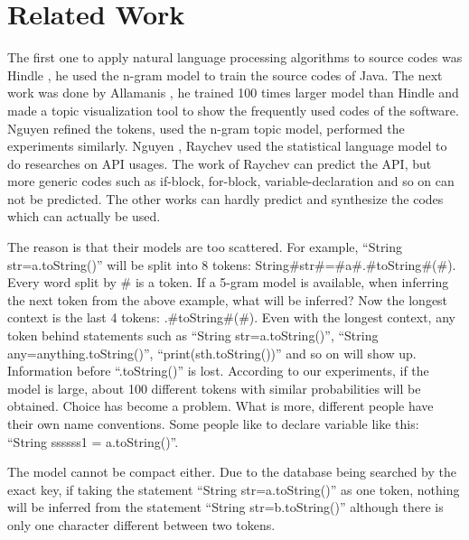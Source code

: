 \documentclass{sig-alternate-05-2015}
\begin{document}

\vspace{-0.2cm}
\section{Related Work}

The first one to apply natural language processing algorithms to source codes was Hindle \cite{DBLP:conf/icse/HindleBSGD12}, he used the n-gram \cite{cavnar1994n} model to train the source codes of Java. The next work was done by Allamanis \cite{DBLP:conf/msr/AllamanisS13a}, he trained 100 times larger model than Hindle and made a topic visualization tool to show the frequently used codes of the software. Nguyen \cite{DBLP:conf/sigsoft/NguyenNNN13} refined the tokens, used the n-gram topic \cite{wang2007topical} model, performed the experiments similarly. Nguyen \cite{DBLP:conf/icse/NguyenN15}, Raychev \cite{DBLP:conf/pldi/RaychevVY14} used the statistical language model to do researches on API usages. The work of Raychev can predict the API, but more generic codes such as if-block, for-block, variable-declaration and so on can not be predicted. The other works can hardly predict and synthesize the codes which can actually be used.

The reason is that their models are too scattered. For example, ``String str=a.toString()'' will be split into 8 tokens: String$\#$str$\#$=$\#$a$\#$.$\#$toString$\#$($\#$). Every word split by $\#$ is a token. If a 5-gram model is available, when inferring the next token from the above example, what will be inferred? Now the longest context is the last 4 tokens: .\#toString\#(\#). Even with the longest context, any token behind statements such as ``String str=a.toString()'', ``String any=anything.toString()'', ``print(sth.toString())'' and so on will show up. Information before ``.toString()'' is lost. According to our experiments, if the model is large, about 100 different tokens with similar probabilities will be obtained. Choice has become a problem. What is more, different people have their own name conventions. Some people like to declare variable like this: ``String ssssss1 = a.toString()''.

The model cannot be compact either. Due to the database being searched by the exact key, if taking the statement ``String str=a.toString()'' as one token, nothing will be inferred from the statement ``String str=b.toString()'' although there is only one character different between two tokens.
\end{document}
